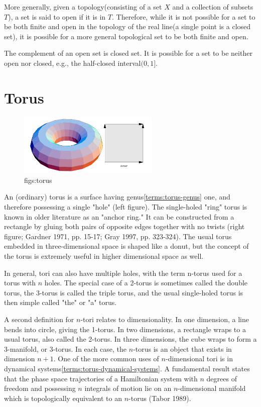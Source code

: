 \documentclass[lang=en,11pt,a4paper,cite=numbers]{elegantpaper}
\begin{document}
  More generally, given a topology(consisting of a set $X$ and a collection of subsets $T$), a set is said to open if it is in $T$. Therefore, while it is not possible for a set to be both finite and open in the topology of the real line(a single point is a closed set), it is possible for a more general topological set to be both finite and open.

  The complement of an open set is closed set. It is possible for a set to be neither open nor closed, e.g., the half-closed interval$(0,1]$.

\section{Torus\cite{torus}}
\label{terms:torus}
\begin{figure}[!htb]
  \centering
  \includegraphics[width=0.6\textwidth]{figs/torus.png}
  \caption{figs:torus}
  \label{figs:torus}
\end{figure}
  An (ordinary) torus is a surface having genus\ref{terms:torus-genus} one, and therefore possessing a single "hole" (left figure). The single-holed "ring" torus is known in older literature as an "anchor ring." It can be constructed from a rectangle by gluing both pairs of opposite edges together with no twists (right figure; Gardner 1971, pp. 15-17; Gray 1997, pp. 323-324). The usual torus embedded in three-dimensional space is shaped like a donut, but the concept of the torus is extremely useful in higher dimensional space as well.

  In general, tori can also have multiple holes, with the term n-torus used for a torus with $n$ holes. The special case of a 2-torus is sometimes called the double torus, the 3-torus is called the triple torus, and the usual single-holed torus is then simple called "the" or "a" torus.

  A second definition for $n$-tori relates to dimensionality. In one dimension, a line bends into circle, giving the 1-torus. In two dimensions, a rectangle wraps to a usual torus, also called the 2-torus. In three dimensions, the cube wraps to form a 3-manifold, or 3-torus. In each case, the $n$-torus is an object that exists in dimension $n+1$. One of the more common uses of $n$-dimensional tori is in dynamical systems\ref{terms:torus-dynamical-systems}. A fundamental result states that the phase space trajectories of a Hamiltonian system with $n$ degrees of freedom and possessing $n$ integrals of motion lie on an $n$-dimensional manifold which is topologically equivalent to an $n$-torus (Tabor 1989).
\end{document}
